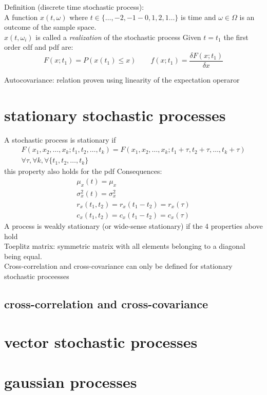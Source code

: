 \documentclass{book}
\theoremstyle{definition}
\theoremstyle{remark}
\theoremstyle{remark}
\begin{document}
Definition (discrete time stochastic process):\\
A function $x(t,\omega)$ where $t \in \{\dots, -2,-1-0,1,2,1\dots\}$ is time and $\omega \in \Omega$ is an outcome of the sample space.\\
$x(t,\omega_i)$ is called a \emph{realization} of the stochastic process
Given $t=t_1$ the first order cdf and pdf are:
\[F(x;t_1)=P(x(t_1)\leq x) \qquad f(x;t_1)=\frac{\delta F(x;t_1)}{\delta x}\]

Autocovariance: 
relation proven using linearity of the expectation operaror

\section{stationary stochastic processes}
A stochastic process is stationary if 
\begin{gather}
    F(x_1,x_2,\dots, x_k;t_1,t_2,\dots,t_k)=F(x_1,x_2,\dots, x_k;t_1+\tau,t_2+ \tau,\dots,t_k+ \tau)\\
    \forall \tau, \forall k, \forall \{t_1,t_2,\dots,t_k\}
\end{gather}
this property also holds for the pdf
Consequences:
\begin{gather}
    \mu_x(t)=\mu_x\\
    \sigma_x^2(t)=\sigma_x^2\\
    r_x(t_1,t_2)=r_x(t_1-t_2)=r_x(\tau)\\
    c_x(t_1,t_2)=c_x(t_1-t_2)=c_x(\tau)
\end{gather}
A process is weakly stationary (or wide-sense stationary) if the 4 properties above hold
\\Toeplitz matrix: symmetric matrix with all elements belonging to a diagonal being equal. \\
Cross-correlation and cross-covariance can only be defined for stationary stochastic proceesses

\subsection{cross-correlation and cross-covariance}

\section{vector stochastic processes}

\section{gaussian processes}
\end{document}
